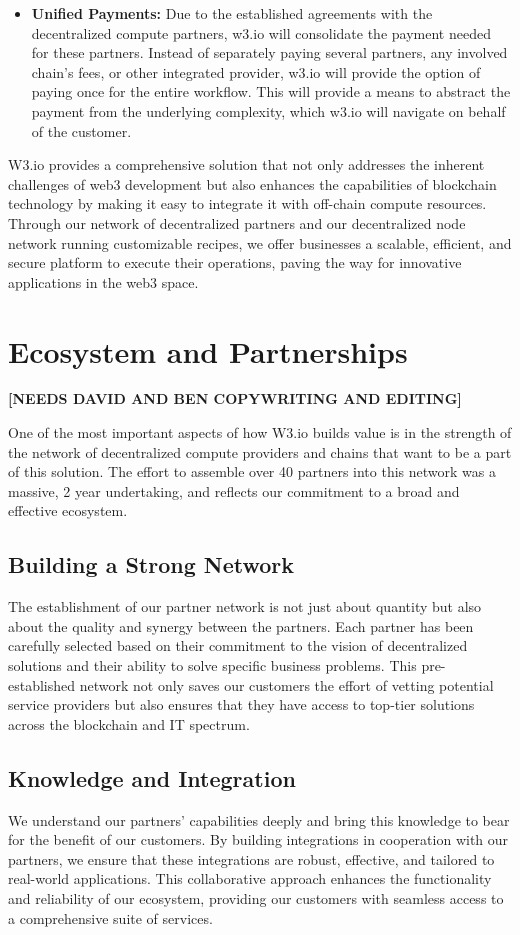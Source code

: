 \documentclass[11pt]{article}
\newcommand{\needs}[1]{\textbf{\color{red}[\MakeUppercase{#1}]}}
\begin{document}
\begin{itemize}
    \item \textbf{Unified Payments:} Due to the established agreements with the decentralized compute partners, w3.io will consolidate the payment needed for these partners. Instead of separately paying several partners, any involved chain's fees, or other integrated provider, w3.io will provide the option of paying once for the entire workflow. This will provide a means to abstract the payment from the underlying complexity, which w3.io will navigate on behalf of the customer.
\end{itemize}

W3.io provides a comprehensive solution that not only addresses the inherent challenges of web3 development but also enhances the capabilities of blockchain technology by making it easy to integrate it with off-chain compute resources. Through our network of decentralized partners and our decentralized node network running customizable recipes, we offer businesses a scalable, efficient, and secure platform to execute their operations, paving the way for innovative applications in the web3 space.

\section{Ecosystem and Partnerships}
\needs{NEEDS DAVID AND BEN COPYWRITING AND EDITING}

One of the most important aspects of how W3.io builds value is in the strength of the network of decentralized compute providers and chains that want to be a part of this solution. The effort to assemble over 40 partners into this network was a massive, 2 year undertaking, and reflects our commitment to a broad and effective ecosystem.

\subsection{Building a Strong Network}
The establishment of our partner network is not just about quantity but also about the quality and synergy between the partners. Each partner has been carefully selected based on their commitment to the vision of decentralized solutions and their ability to solve specific business problems. This pre-established network not only saves our customers the effort of vetting potential service providers but also ensures that they have access to top-tier solutions across the blockchain and IT spectrum.

\subsection{Knowledge and Integration}
We understand our partners' capabilities deeply and bring this knowledge to bear for the benefit of our customers. By building integrations in cooperation with our partners, we ensure that these integrations are robust, effective, and tailored to real-world applications. This collaborative approach enhances the functionality and reliability of our ecosystem, providing our customers with seamless access to a comprehensive suite of services.
\end{document}
